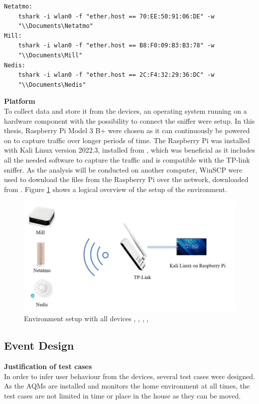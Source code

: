 \begin{verbatim}
Netatmo:
    tshark -i wlan0 -f "ether.host == 70:EE:50:91:06:DE" -w 
    "\\Documents\Netatmo"
Mill:
    tshark -i wlan0 -f "ether.host == B8:F0:09:B3:B3:78" -w 
    "\\Documents\Mill"
Nedis:
    tshark -i wlan0 -f "ether.host == 2C:F4:32:29:36:DC" -w 
    "\\Documents\Nedis"
\end{verbatim}

\noindent
\textbf{Platform}\\
To collect data and store it from the devices, an operating system running on a hardware component with the possibility to connect the sniffer were setup. In this thesis, Raspberry Pi Model 3 B+ were chosen as it can continuously be powered on to capture traffic over longer periods of time. The Raspberry Pi was installed with Kali Linux version 2022.3, installed from \cite{KaliLinux}, which was beneficial as it includes all the needed software to capture the traffic and is compatible with the TP-link sniffer. As the analysis will be conducted on another computer, WinSCP were used to download the files from the Raspberry Pi over the network, downloaded from \cite{WinSCP}. Figure \ref{fig:Environment} shows a logical overview of the setup of the environment.  

\begin{figure} [H]
    \centering
    \includegraphics[width=1\textwidth]{figures/Environment.png}
    \caption{Environment setup with all devices \cite{MillSense}, \cite{NetatmoDevice}, \cite{NedisDevice}, \cite{Sniffer}, \cite{KaliLinux}}
    \label{fig:Environment}
\end{figure}

\subsection{Event Design}
\textbf{Justification of test cases}\\
In order to infer user behaviour from the devices, several test cases were designed. As the \gls{AQM}s are installed and monitors the home environment at all times, the test cases are not limited in time or place in the house as they can be moved. 


